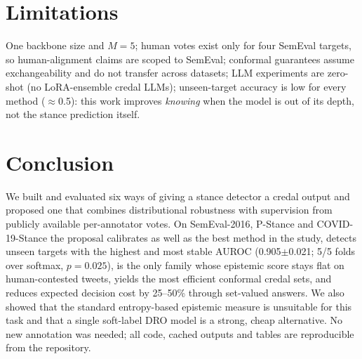 \documentclass[11pt,a4paper]{article}
\begin{document}
\section{Limitations}
One backbone size and $M=5$; human votes exist only for four SemEval targets, so human-alignment claims are scoped to SemEval; conformal guarantees assume exchangeability and do not transfer across datasets; LLM experiments are zero-shot (no LoRA-ensemble credal LLMs); unseen-target accuracy is low for every method ($\approx$0.5): this work improves \emph{knowing} when the model is out of its depth, not the stance prediction itself.

\section{Conclusion}
We built and evaluated six ways of giving a stance detector a credal output and proposed one that combines distributional robustness with supervision from publicly available per-annotator votes. On SemEval-2016, P-Stance and COVID-19-Stance the proposal calibrates as well as the best method in the study, detects unseen targets with the highest and most stable AUROC (0.905$\pm$0.021; 5/5 folds over softmax, $p=0.025$), is the only family whose epistemic score stays flat on human-contested tweets, yields the most efficient conformal credal sets, and reduces expected decision cost by 25--50\% through set-valued answers. We also showed that the standard entropy-based epistemic measure is unsuitable for this task and that a single soft-label DRO model is a strong, cheap alternative. No new annotation was needed; all code, cached outputs and tables are reproducible from the repository.
\end{document}
